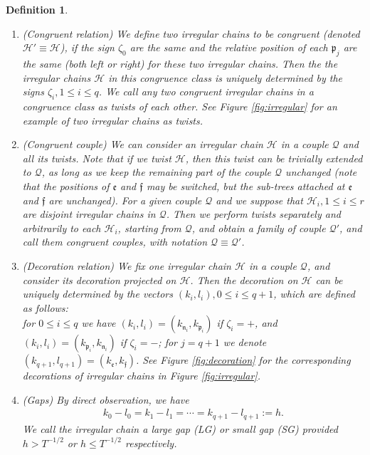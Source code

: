 \documentclass[UTF-8,reqno]{amsart}
\numberwithin{equation}{section}
\newtheorem{definition}[theorem]{Definition}
\theoremstyle{definition}
\def\leq{\leqslant}
\def\leq{\leqslant}
\begin{document}
\begin{definition}\label{def:twist}

\begin{enumerate}
\item (Congruent relation) 
 We define two irregular chains to be congruent (denoted $\mathcal{H}'\equiv \mathcal{H}$), if the sign $\zeta_0$ are the same and  the relative
 position of each $\mathfrak{p}_j$  are the same (both left or right) for these two irregular chains. Then the  the irregular chains $\mathcal{H}$  in this congruence class is uniquely determined
 by the signs $\zeta_{i},1\leq i\leq q$.
  We  call any two congruent irregular chains in a congruence class as twists of each  other.  See Figure \ref{fig:irregular} for an example of two irregular chains as twists.
 \item (Congruent couple) We can consider an irregular chain $\mathcal{H}$ in a couple $\mathcal{Q}$ and all its
 twists. Note that if we twist $\mathcal{H}$, then this twist can be trivially extended to $\mathcal{Q}$, as long as we
 keep the remaining part of the couple $\mathcal{Q}$ unchanged (note that the positions of $\mathfrak{e}$ and $\mathfrak{f}$ may be
 switched, but the sub-trees attached at $\mathfrak{e}$ and $\mathfrak{f}$ are unchanged).  For a given couple $\mathcal{Q}$ and we  suppose that $\mathcal{H}_i,1\leq i\leq r$ are disjoint irregular chains in $\mathcal{Q}$. Then we
  perform twists separately and arbitrarily to  each $\mathcal{H}_i$, starting from $\mathcal{Q}$, and obtain a family of couple $\mathcal{Q}'$, and call them congruent couples, with notation $\mathcal{Q}\equiv\mathcal{Q}'$.  
  \item (Decoration relation) We fix one irregular chain $\mathcal{H}$ in a couple $\mathcal{Q}$, and consider its decoration projected on $\mathcal{H}$.  Then the
  decoration on $\mathcal{H}$ can be uniquely determined by the vectors
 $(k_i, l_i), 0 \leq i\leq q +1$, which are defined as follows:\\ for   $0 \leq i\leq q $ we have $(k_i,l_i)=(k_{\mathfrak{n}_i},k_{\mathfrak{p}_i})$ if $\zeta_i=+$, and $(k_i,l_i)=(k_{\mathfrak{p}_i},k_{\mathfrak{n}_i})$ if $\zeta_i=-$; for $j=q+1$ we denote $(k_{q+1},l_{q+1}) = (k_{\mathfrak{e}},k_{\mathfrak{f}})$.  See Figure \ref{fig:decoration} for the corresponding decorations of irregular chains in Figure \ref{fig:irregular}.
 \item (Gaps) By direct observation,   we have  \begin{align}
     k_0-l_0=k_1-l_1=\cdots=k_{q+1}-l_{q+1}:=h.
 \end{align} 
 We call the irregular chain a large gap (LG) or small gap (SG) provided $h> T^{-1/2}$ or $h\leq T^{-1/2}$ respectively.
 \end{enumerate}
\end{definition}
\end{document}
